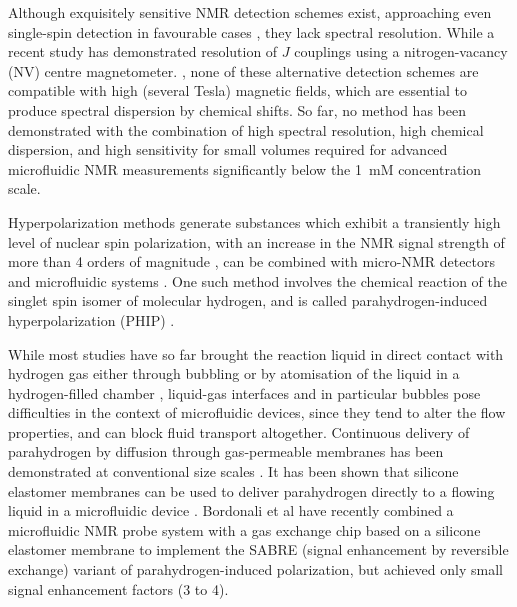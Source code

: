  Although exquisitely sensitive NMR detection schemes exist,
 approaching even single-spin detection in favourable cases
 \cite{Rugar:1992dm,Rugar:2004bc,Mamin:2007ff,Poggio:2010jf,
 Maze:2008cs,Staudacher:2013kn,Rugar:2015by,McDermott:2002hp,
 Budker:2007hz,Xu:2006kg,Blanchard:2013gs}, they lack spectral resolution.
 While a recent study
 has demonstrated resolution of $J$ couplings using a nitrogen-vacancy
 (NV) centre magnetometer. \cite{Glenn:2018ct}, none of these
 alternative detection schemes are compatible with high (several Tesla)
 magnetic fields, which are essential to produce spectral dispersion
 by chemical shifts.
 So far, no method has been demonstrated with the combination of high
 spectral resolution, high chemical dispersion,
 and high sensitivity for small volumes required for
 advanced microfluidic NMR measurements significantly
 below the 1~mM concentration scale.

 Hyperpolarization methods generate substances which exhibit a transiently high
 level of nuclear spin polarization, with an increase in the NMR signal strength
 of more than 4 orders of magnitude \cite{munnemann2011nuclear}, can be combined
 with micro-NMR detectors and microfluidic systems \cite{McDonnell:2005dn,Desvaux:2009bq,Telkki:2010vg,Paciok:2011ek,JimenezMartinez:2014et,Causier:2015fg,eills-hale2018EuromarPHIP,Bordonali:2019jqa}.
 One such method
 involves the chemical reaction of the singlet spin isomer of molecular
 hydrogen, and is called parahydrogen-induced hyperpolarization (PHIP)
 \cite{hovener2018parahydrogen,duckett2012application,gloggler2013hydrogen,green2012theory}.

 While most studies have so far brought the reaction liquid in direct contact
 with hydrogen gas either through bubbling or by atomisation of the liquid
 in a hydrogen-filled chamber \cite{bhattacharya2007towards,chekmenev2008pasadena,
 chekmenev2009hyperpolarized,shchepin2014parahydrogen,
 Reineri:2015he,cavallari201813,eills2017singlet},
 liquid-gas interfaces and in particular bubbles
 pose difficulties in the context of microfluidic devices, since they tend
 to alter the flow properties, and can block fluid transport altogether.
 Continuous delivery of parahydrogen by diffusion through
 gas-permeable membranes has been demonstrated at
 conventional size scales \cite{Roth:2010hk,Lehmkuhl:2018cd}.
 It has been shown that silicone elastomer membranes can be used
 to deliver parahydrogen directly to a flowing liquid in a microfluidic
 device \cite{eills-hale2018EuromarPHIP}. Bordonali et al\cite{Bordonali:2019jqa} have
 recently combined a microfluidic NMR probe system with a gas exchange
 chip based on a silicone elastomer membrane to implement the SABRE (signal
 enhancement by reversible exchange) variant of parahydrogen-induced polarization,
 but achieved only small signal enhancement factors (3 to 4).

